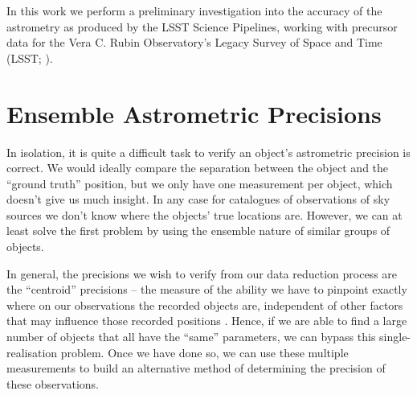 \documentclass[SE,lsstdraft,authoryear,toc]{lsstdoc}
\begin{document}
In this work we perform a preliminary investigation into the accuracy of the astrometry as produced by the LSST Science Pipelines, working with precursor data for the Vera C. Rubin Observatory's Legacy Survey of Space and Time (LSST; \citealp{Ivezic2019}).

\section{Ensemble Astrometric Precisions}
In isolation, it is quite a difficult task to verify an object's astrometric precision is correct.
We would ideally compare the separation between the object and the ``ground truth'' position, but we only have one measurement per object, which doesn't give us much insight.
In any case for catalogues of observations of sky sources we don't know where the objects' true locations are.
However, we can at least solve the first problem by using the ensemble nature of similar groups of objects.

In general, the precisions we wish to verify from our data reduction process are the ``centroid'' precisions -- the measure of the ability we have to pinpoint exactly where on our observations the recorded objects are, independent of other factors that may influence those recorded positions \citep{2017MNRAS.468.2517W,2018MNRAS.481.2148W}.
Hence, if we are able to find a large number of objects that all have the ``same'' parameters, we can bypass this single-realisation problem.
Once we have done so, we can use these multiple measurements to build an alternative method of determining the precision of these observations.
\end{document}
